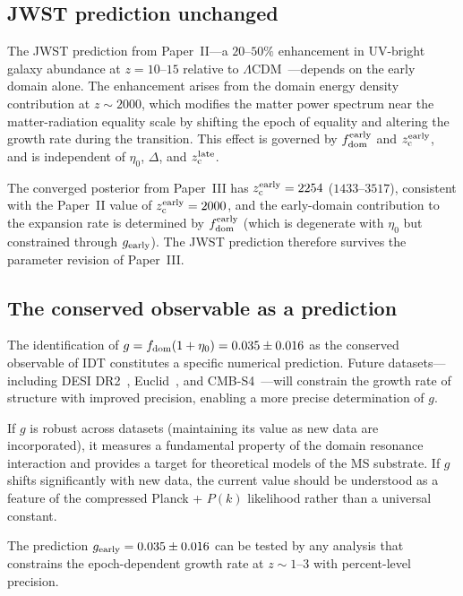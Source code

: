 \documentclass[aps,prd,twocolumn,superscriptaddress,nofootinbib]{revtex4-2}
\newcommand{\fdom}{f_{\rm dom}}
\newcommand{\zc}{z_{\rm c}}
\newcommand{\gearly}{g_{\rm early}}
\newcommand{\etaz}{\eta_0}
\begin{document}
\subsection{JWST prediction unchanged}
\label{sec:jwst}

The JWST prediction from Paper~II---a $20$--$50\%$ enhancement in
UV-bright galaxy abundance at $z = 10$--$15$ relative to
$\Lambda$CDM~\cite{Paper2}---depends on the early domain alone. The
enhancement arises from the domain energy density contribution at
$z \sim 2000$, which modifies the matter power spectrum near the
matter-radiation equality scale by shifting the epoch of equality and
altering the growth rate during the transition. This effect is
governed by $\fdom^{\rm early}$ and $\zc^{\rm early}$, and is
independent of $\etaz$, $\Delta$, and $\zc^{\rm late}$.

The converged posterior from Paper~III has $\zc^{\rm early} = 2254$
($1433$--$3517$), consistent with the Paper~II value of $\zc^{\rm
early} = 2000$, and the early-domain contribution to the expansion
rate is determined by $\fdom^{\rm early}$ (which is degenerate with
$\etaz$ but constrained through $\gearly$). The JWST prediction
therefore survives the parameter revision of Paper~III.

\subsection{The conserved observable as a prediction}
\label{sec:g_prediction}

The identification of $g = \fdom(1 + \etaz) = 0.035 \pm 0.016$ as
the conserved observable of IDT constitutes a specific numerical
prediction. Future datasets---including DESI DR2~\cite{DESI2024},
Euclid~\cite{Euclid2024}, and CMB-S4~\cite{CMBS42019}---will
constrain the growth rate of structure with improved precision,
enabling a more precise determination of $g$.

If $g$ is robust across datasets (maintaining its value as new data
are incorporated), it measures a fundamental property of the domain
resonance interaction and provides a target for theoretical models of
the MS substrate. If $g$ shifts significantly with new data, the
current value should be understood as a feature of the compressed
Planck + $P(k)$ likelihood rather than a universal constant.

The prediction $\gearly = 0.035 \pm 0.016$ can be tested by any
analysis that constrains the epoch-dependent growth rate at
$z \sim 1$--$3$ with percent-level precision.
\end{document}
